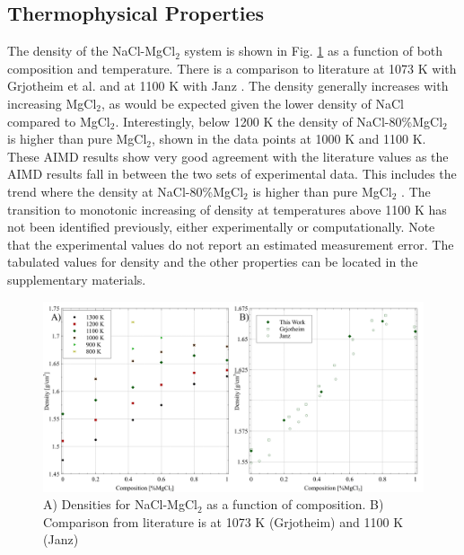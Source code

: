\documentclass[review]{elsarticle}
\begin{document}





\FloatBarrier

\subsection{Thermophysical Properties}
The density of the NaCl-MgCl$_2$ system is shown in Fig. \ref{fig:density} as a function of both composition and temperature. There is a comparison to literature at 1073 K with Grjotheim et al. \cite{grjotheim1971} and at 1100 K with Janz \cite{Janz1988}. The density generally increases with increasing MgCl$_2$, as would be expected given the lower density of NaCl compared to MgCl$_2$. Interestingly, below 1200 K the density of NaCl-80\%MgCl$_2$ is higher than pure MgCl$_2$, shown in the data points at 1000 K and 1100 K. These AIMD results show very good agreement with the literature values as the AIMD results fall in between the two sets of experimental data. This includes the trend where the density at NaCl-80\%MgCl$_2$ is higher than pure MgCl$_2$ \cite{grjotheim1971}. The transition to monotonic increasing of density at temperatures above 1100 K has not been identified previously, either experimentally or computationally. Note that the experimental values do not report an estimated measurement error. The tabulated values for density and the other properties can be located in the supplementary materials.
\begin{figure}[h]
 \centering
 \includegraphics[width=1.0\textwidth]{density_combined_figures.jpg} 
 \caption{A) Densities for NaCl-MgCl$_2$ as a function of composition. B) Comparison from literature is at 1073 K (Grjotheim) \cite{grjotheim1971} and 1100 K (Janz) \cite{Janz1988}}
 \label{fig:density}
\end{figure} 
\end{document}
